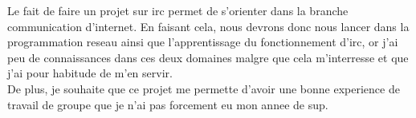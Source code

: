 Le fait de faire un projet sur irc permet de s'orienter dans la branche communication d'internet. En faisant cela, nous devrons donc nous lancer dans la programmation reseau ainsi que l'apprentissage du fonctionnement d'irc, or j'ai peu de connaissances dans ces deux domaines malgre que cela m'interresse et que j'ai pour habitude de m'en servir. \\
De plus, je souhaite que ce projet me permette d'avoir une bonne experience de travail de groupe que je n'ai pas forcement eu mon annee de sup.